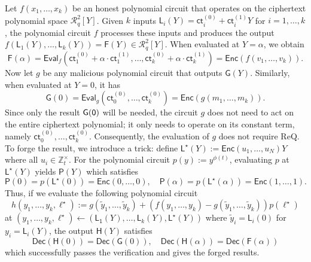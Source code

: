 \documentclass[runningheads]{llncs}
\newcommand{\bb}[1]{\mathbb{#1}}  %
\newcommand{\ct}{\textsf{ct}{}}
\newcommand{\eval}{\textsf{Eval}}
\newcommand{\REQ}{\textsf{ReQ}}
\newcommand{\dec}{\textsf{Dec}}
\newcommand{\enc}{\textsf{Enc}}
\begin{document}
    Let $f(x_1,\dots, x_k)$ be an honest polynomial circuit that operates on the ciphertext polynomial space $\mathcal{R}^2_q[Y]$.
    Given $k$ inputs $\mathsf{L}_i(Y) = \ct^{(0)}_i + \ct^{(1)}_i Y$ for $i=1,\dots, k$, the polynomial circuit $f$ processes these inputs and produces the output
    \(
        f(\mathsf{L}_1(Y), \dots, \mathsf{L}_k(Y)) = \mathsf{F}(Y) \in \mathcal{R}^2_q[Y].
    \)
    When evaluated at $Y = \alpha$, we obtain
    \[
        \mathsf{F}(\alpha) = \eval_f(\ct_1^{(0)}+\alpha\cdot\ct_1^{(1)}, \dots, \ct_k^{(0)}+\alpha\cdot\ct_k^{(1)}) = \enc(f(v_1, \dots, v_k)).
    \]
    Now let $g$ be any malicious polynomial circuit that outputs $\mathsf{G}(Y)$. Similarly, when evaluated at $Y=0$, it has
    \[
        \mathsf{G}(0) = \eval_g(\ct_0^{(0)}, \dots, \ct_k^{(0)}) = \enc(g(m_1, \dots, m_k)).
    \]
    Since only the result $\sf G(0)$ will be needed, the circuit $g$ does not need to act on the entire ciphertext polynomial; it only needs to operate on its constant term, namely $\ct_0^{(0)}, \dots, \ct_k^{(0)}$. Consequently, the evaluation of $g$ does not require \REQ{}.
    To forge the result, we introduce a trick: define $\mathsf{L}^\star(Y):= \enc(u_1,\dots,u_N) Y$ where all $u_i\in \bb Z_t^\times$. For the polynomial circuit $p(y) := y^{\phi(t)}$, evaluating $p$ at $\mathsf{L}^\star(Y)$ yields $\mathsf P(Y)$ which satisfies
    \[
        \mathsf{P}(0) = p(\mathsf{L}^\star(0)) = \enc(0,\dots,0), \quad \mathsf{P}(\alpha) = p(\mathsf{L}^\star(\alpha)) = \enc(1,\dots,1). 
    \]
    Thus, if we evaluate the following polynomial circuit
    \[
        h(y_1, \dots, y_k, \ell^\star) := g(\tilde y_1, \dots, \tilde y_k) + (f(y_1, \dots, y_k) - g(\tilde y_1, \dots, \tilde y_k)) p(\ell^\star)
    \]
    at $\left(y_1,\dots,y_k,\ell^\star\right)\gets\left(\mathsf{L_1}(Y),\dots,\mathsf L_{k}(Y),\mathsf{L}^\star(Y)\right)$ where $\tilde y_i=\mathsf{L}_i(0)$ for $y_i=\mathsf{L}_i(Y)$,
    the output $\mathsf{H}(Y)$ satisfies
    \[
        \dec(\mathsf{H}(0)) = \dec(\mathsf{G}(0)), \quad \dec(\mathsf{H}(\alpha)) = \dec(\mathsf{F}(\alpha))
    \]
    which successfully passes the verification and gives the forged results.
\end{document}
